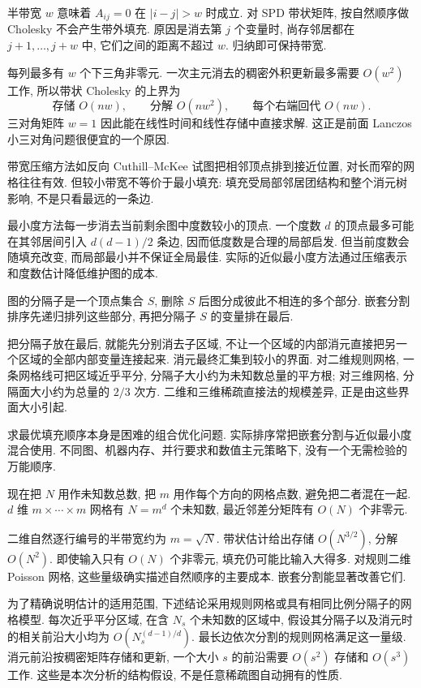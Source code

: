 半带宽 $w$ 意味着 $A_{ij}=0$ 在 $|i-j|>w$ 时成立. 对 SPD 带状矩阵, 按自然顺序做 Cholesky 不会产生带外填充. 原因是消去第 $j$ 个变量时, 尚存邻居都在 $j+1,\ldots,j+w$ 中, 它们之间的距离不超过 $w$. 归纳即可保持带宽.

每列最多有 $w$ 个下三角非零元. 一次主元消去的稠密外积更新最多需要 $O(w^2)$ 工作, 所以带状 Cholesky 的上界为
\[
\text{存储 }O(nw),\qquad\text{分解 }O(nw^2),\qquad
\text{每个右端回代 }O(nw).
\]
三对角矩阵 $w=1$ 因此能在线性时间和线性存储中直接求解. 这正是前面 Lanczos 小三对角问题很便宜的一个原因.

带宽压缩方法如反向 Cuthill--McKee 试图把相邻顶点排到接近位置, 对长而窄的网格往往有效. 但较小带宽不等价于最小填充: 填充受局部邻居团结构和整个消元树影响, 不是只看最远的一条边.

最小度方法每一步消去当前剩余图中度数较小的顶点. 一个度数 $d$ 的顶点最多可能在其邻居间引入 $d(d-1)/2$ 条边, 因而低度数是合理的局部启发. 但当前度数会随填充改变, 而局部最小并不保证全局最佳. 实际的近似最小度方法通过压缩表示和度数估计降低维护图的成本.

\begin{definition}
图的分隔子是一个顶点集合 $S$, 删除 $S$ 后图分成彼此不相连的多个部分. 嵌套分割排序先递归排列这些部分, 再把分隔子 $S$ 的变量排在最后.
\end{definition}
把分隔子放在最后, 就能先分别消去子区域, 不让一个区域的内部消元直接把另一个区域的全部内部变量连接起来. 消元最终汇集到较小的界面. 对二维规则网格, 一条网格线可把区域近乎平分, 分隔子大小约为未知数总量的平方根; 对三维网格, 分隔面大小约为总量的 $2/3$ 次方. 二维和三维稀疏直接法的规模差异, 正是由这些界面大小引起.

求最优填充顺序本身是困难的组合优化问题. 实际排序常把嵌套分割与近似最小度混合使用. 不同图、机器内存、并行要求和数值主元策略下, 没有一个无需检验的万能顺序.

现在把 $N$ 用作未知数总数, 把 $m$ 用作每个方向的网格点数, 避免把二者混在一起. $d$ 维 $m\times\cdots\times m$ 网格有 $N=m^d$ 个未知数, 最近邻差分矩阵有 $O(N)$ 个非零元.

二维自然逐行编号的半带宽约为 $m=\sqrt N$. 带状估计给出存储 $O(N^{3/2})$, 分解 $O(N^2)$. 即使输入只有 $O(N)$ 个非零元, 填充仍可能比输入大得多. 对规则二维 Poisson 网格, 这些量级确实描述自然顺序的主要成本. 嵌套分割能显著改善它们.

为了精确说明估计的适用范围, 下述结论采用规则网格或具有相同比例分隔子的网格模型. 每次近乎平分区域, 在含 $N_s$ 个未知数的区域中, 假设其分隔子以及消元时的相关前沿大小均为 $O(N_s^{(d-1)/d})$. 最长边依次分割的规则网格满足这一量级. 消元前沿按稠密矩阵存储和更新, 一个大小 $s$ 的前沿需要 $O(s^2)$ 存储和 $O(s^3)$ 工作. 这些是本次分析的结构假设, 不是任意稀疏图自动拥有的性质.

